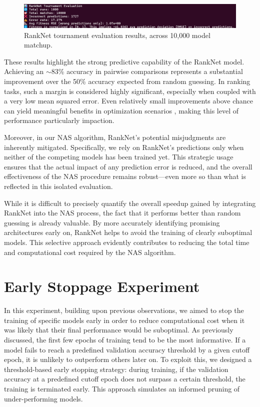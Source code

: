 \begin{figure}[ht]
    \centering
    \includegraphics[width=1.05\linewidth]{Pictures/RankNetComparison3.png}
    \caption{RankNet tournament evaluation results, across 10,000 model matchup.}
    \label{fig:RankNetComparison}
\end{figure}


These results highlight the strong predictive capability of the RankNet model. Achieving an $\sim$83\% accuracy in pairwise comparisons represents a substantial improvement over the 50\% accuracy expected from random guessing. In ranking tasks, such a margin is considered highly significant, especially when coupled with a very low mean squared error. Even relatively small improvements above chance can yield meaningful benefits in optimization scenarios \cite{freund1999large}, making this level of performance particularly impaction.

Moreover, in our NAS algorithm, RankNet's potential misjudgments are inherently mitigated. Specifically, we rely on RankNet's predictions only when neither of the competing models has been trained yet. This strategic usage ensures that the actual impact of any prediction error is reduced, and the overall effectiveness of the NAS procedure remains robust—even more so than what is reflected in this isolated evaluation.

While it is difficult to precisely quantify the overall speedup gained by integrating RankNet into the NAS process, the fact that it performs better than random guessing is already valuable. By more accurately identifying promising architectures early on, RankNet helps to avoid the training of clearly suboptimal models. This selective approach evidently contributes to reducing the total time and computational cost required by the NAS algorithm.


\section{Early Stoppage Experiment}

In this experiment, building upon previous observations, we aimed to stop the training of specific models early in order to reduce computational cost when it was likely that their final performance would be suboptimal. As previously discussed, the first few epochs of training tend to be the most informative. If a model fails to reach a predefined validation accuracy threshold by a given cutoff epoch, it is unlikely to outperform others later on. To exploit this, we designed a threshold-based early stopping strategy: during training, if the validation accuracy at a predefined cutoff epoch does not surpass a certain threshold, the training is terminated early. This approach simulates an informed pruning of under-performing models.


